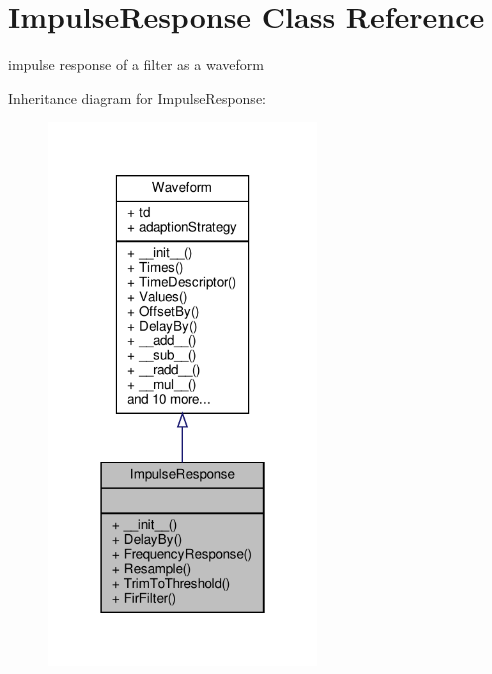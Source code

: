 \hypertarget{classSignalIntegrity_1_1TimeDomain_1_1Waveform_1_1ImpulseResponse_1_1ImpulseResponse}{}\section{Impulse\+Response Class Reference}
\label{classSignalIntegrity_1_1TimeDomain_1_1Waveform_1_1ImpulseResponse_1_1ImpulseResponse}


impulse response of a filter as a waveform  




Inheritance diagram for Impulse\+Response\+:\nopagebreak
\begin{figure}[H]
\begin{center}
\leavevmode
\includegraphics[width=202pt]{classSignalIntegrity_1_1TimeDomain_1_1Waveform_1_1ImpulseResponse_1_1ImpulseResponse__inherit__graph}
\end{center}
\end{figure}


